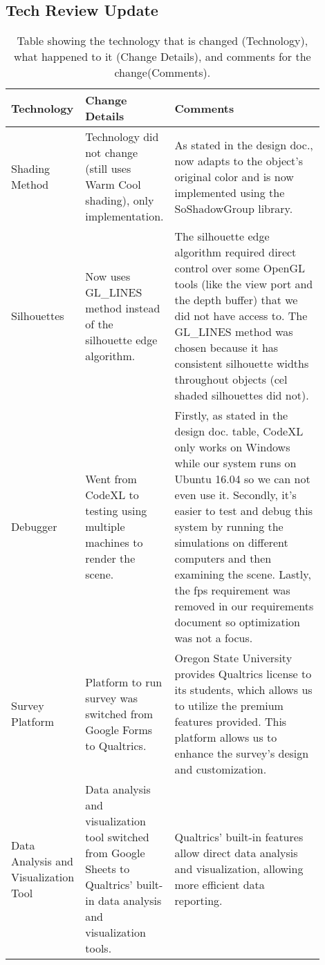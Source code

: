 \documentclass[10pt,journal,compsoc,draftclsnofoot]{IEEEtran}
\begin{document}
\begin{flushleft}
\newpage



\section{Tech Review Update}

\begin{center}
\begin{table}[H]
\caption{Table showing the technology that is changed (Technology), what happened to it (Change Details), and comments for the change(Comments).}
\begin{tabular}{ | p{0.2\linewidth} | p{0.2\linewidth} | p{0.5\linewidth} | }
\hline
\textbf{Technology}  & \textbf{Change Details}  & \textbf{Comments} \\ \hline

Shading Method & 
Technology did not change (still uses Warm Cool shading), only implementation. & 
As stated in the design doc., now adapts to the object's original color and is now implemented using the SoShadowGroup library. \\ \hline
Silhouettes &
Now uses GL\_LINES method instead of the silhouette edge algorithm. &
The silhouette edge algorithm required direct control over some OpenGL tools (like the view port and the depth buffer) that we did not have access to.
The GL\_LINES method was chosen because it has consistent silhouette widths throughout objects (cel shaded silhouettes did not). \\ \hline
Debugger  &
Went from CodeXL to testing using multiple machines to render the scene. &
Firstly, as stated in the design doc. table, CodeXL only works on Windows while our system runs on Ubuntu 16.04 so we can not even use it.
Secondly, it's easier to test and debug this system by running the simulations on different computers and then examining the scene.
Lastly, the fps requirement was removed in our requirements document so optimization was not a focus. \\ \hline
Survey Platform  &
Platform to run survey was switched from Google Forms to Qualtrics. &
Oregon State University provides Qualtrics license to its students, which allows us to utilize the premium features provided.
This platform allows us to enhance the survey's design and customization. \\ \hline
Data Analysis and Visualization Tool &
Data analysis and visualization tool switched from Google Sheets to Qualtrics' built-in data analysis and visualization tools. &
Qualtrics' built-in features allow direct data analysis and visualization, allowing more efficient data reporting. \\ \hline



\end{tabular}
\end{table}
\end{center}
\end{flushleft}
\end{document}
